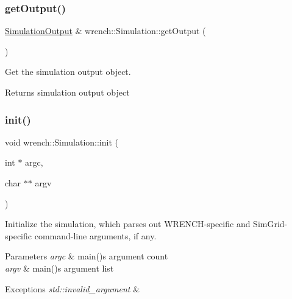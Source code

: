 \subsubsection{\texorpdfstring{get\+Output()}{getOutput()}}
{\footnotesize\ttfamily \hyperlink{classwrench_1_1_simulation_output}{Simulation\+Output} \& wrench\+::\+Simulation\+::get\+Output (\begin{DoxyParamCaption}{ }\end{DoxyParamCaption})}



Get the simulation output object. 

\begin{DoxyReturn}{Returns}
simulation output object 
\end{DoxyReturn}
\mbox{\label{classwrench_1_1_simulation_a3c6d35f1f77f35cbc727ce31e5689992}} 
\subsubsection{\texorpdfstring{init()}{init()}}
{\footnotesize\ttfamily void wrench\+::\+Simulation\+::init (\begin{DoxyParamCaption}\item[{int $\ast$}]{argc,  }\item[{char $\ast$$\ast$}]{argv }\end{DoxyParamCaption})}



Initialize the simulation, which parses out W\+R\+E\+N\+C\+H-\/specific and Sim\+Grid-\/specific command-\/line arguments, if any. 


\begin{DoxyParams}{Parameters}
{\em argc} & main()\textquotesingle{}s argument count \\
\hline
{\em argv} & main()\textquotesingle{}s argument list\\
\hline
\end{DoxyParams}

\begin{DoxyExceptions}{Exceptions}
{\em std\+::invalid\+\_\+argument} & \\
\hline
\end{DoxyExceptions}
\mbox{\label{classwrench_1_1_simulation_ae22639abf6ede9f345b382f5ffe19b0e}} 
